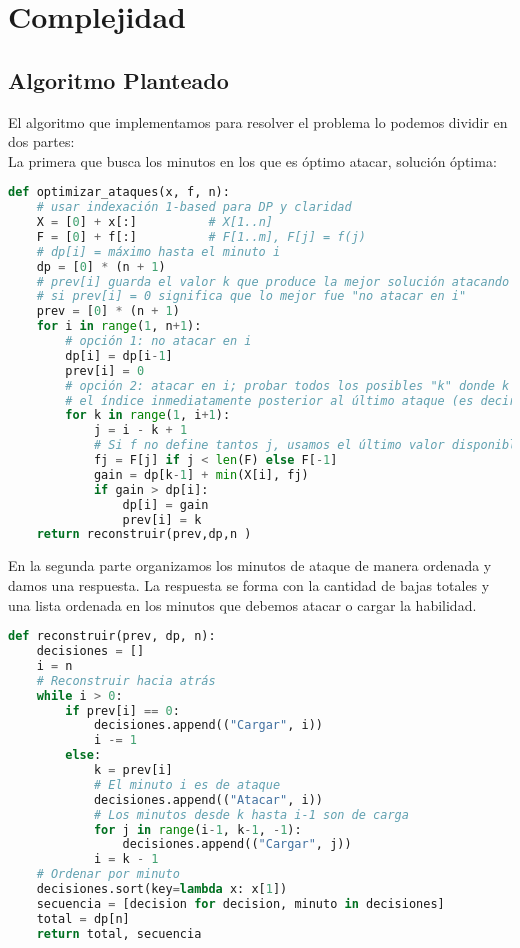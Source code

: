\section{Complejidad}

\subsection{Algoritmo Planteado}

El algoritmo que implementamos para resolver el problema lo podemos dividir en dos partes:\\
La primera que busca los minutos en los que es óptimo atacar, solución óptima:
\begin{lstlisting}[language=Python]
def optimizar_ataques(x, f, n):
    # usar indexación 1-based para DP y claridad
    X = [0] + x[:]          # X[1..n]
    F = [0] + f[:]          # F[1..m], F[j] = f(j)
    # dp[i] = máximo hasta el minuto i
    dp = [0] * (n + 1)
    # prev[i] guarda el valor k que produce la mejor solución atacando en i
    # si prev[i] = 0 significa que lo mejor fue "no atacar en i" 
    prev = [0] * (n + 1)
    for i in range(1, n+1):
        # opción 1: no atacar en i
        dp[i] = dp[i-1]
        prev[i] = 0
        # opción 2: atacar en i; probar todos los posibles "k" donde k indica
        # el índice inmediatamente posterior al último ataque (es decir, acumulamos desde k hasta i inclusive: j = i-k+1 minutos de carga)
        for k in range(1, i+1):
            j = i - k + 1
            # Si f no define tantos j, usamos el último valor disponible (creciente)
            fj = F[j] if j < len(F) else F[-1]
            gain = dp[k-1] + min(X[i], fj)
            if gain > dp[i]:
                dp[i] = gain
                prev[i] = k
    return reconstruir(prev,dp,n )
\end{lstlisting}
En la segunda parte organizamos los minutos de ataque de manera ordenada y damos una respuesta. La respuesta se forma con la cantidad de bajas totales y una lista ordenada en los minutos que debemos atacar o cargar la habilidad.
\begin{lstlisting}[language=Python]
def reconstruir(prev, dp, n):
    decisiones = []
    i = n
    # Reconstruir hacia atrás
    while i > 0:
        if prev[i] == 0:
            decisiones.append(("Cargar", i))
            i -= 1
        else:
            k = prev[i]
            # El minuto i es de ataque
            decisiones.append(("Atacar", i))
            # Los minutos desde k hasta i-1 son de carga
            for j in range(i-1, k-1, -1):
                decisiones.append(("Cargar", j))
            i = k - 1
    # Ordenar por minuto
    decisiones.sort(key=lambda x: x[1])
    secuencia = [decision for decision, minuto in decisiones]
    total = dp[n]
    return total, secuencia
    
\end{lstlisting}
\pagebreak 

